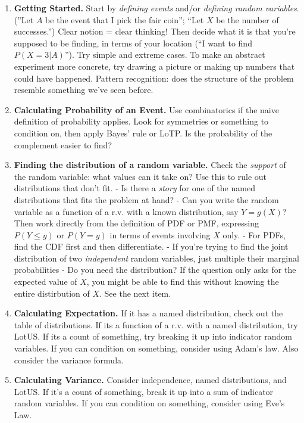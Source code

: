 \documentclass[10pt,landscape]{article}
\theoremstyle{definition}
\begin{document}
\begin{multicols}{3}
\begin{enumerate} \itemsep -.25em
\item \textbf{Getting Started.} Start by \emph{defining events} and/or \emph{defining random variables}. (''Let $A$ be the event that I pick the fair coin''; ``Let $X$ be the number of successes.'') Clear notion = clear thinking! Then decide what it is that you're supposed to be finding, in terms of your location (``I want to find $P(X=3|A)$''). Try simple and extreme cases. To make an abstract experiment more concrete, try drawing a picture or making up numbers that could have happened. Pattern recognition: does the structure of the problem resemble something we've seen before.
\item \textbf{Calculating Probability of an Event.} Use combinatorics if the naive definition of probability applies. Look for symmetries or something to condition on, then apply Bayes' rule or LoTP. Is the probability of the complement easier to find?
\item \textbf{Finding the distribution of a random variable.} Check the \emph{support} of the random variable: what values can it take on? Use this to rule out distributions that don't fit. - Is there a \emph{story} for one of the named distributions that fits the problem at hand? - Can you write the random variable as a function of a r.v. with a known distribution, say $Y = g(X)$? Then work directly from the definition of PDF or PMF, expressing $P(Y \leq y)$ or $P(Y = y)$ in terms of events involving $X$ only. - For PDFs, find the CDF first and then differentiate. - If you're trying to find the joint distribution of two \emph{independent} random variables, just multiple their marginal probabilities - Do you need the distribution? If the question only asks for the expected value of $X$, you might be able to find this without knowing the entire distirbution of $X$. See the next item.
\item \textbf{Calculating Expectation.} If it has a named distribution, check out the table of distributions. If its a function of a r.v. with a named distribution, try LotUS. If its a count of something, try breaking it up into indicator random variables. If you can condition on something, consider using Adam's law. Also consider the variance formula.
\item \textbf{Calculating Variance.} Consider independence, named distributions, and LotUS. If it's a count of something, break it up into a sum of indicator random variables. If you can condition on something, consider using Eve's Law.

\end{enumerate}
\end{multicols}
\end{document}
